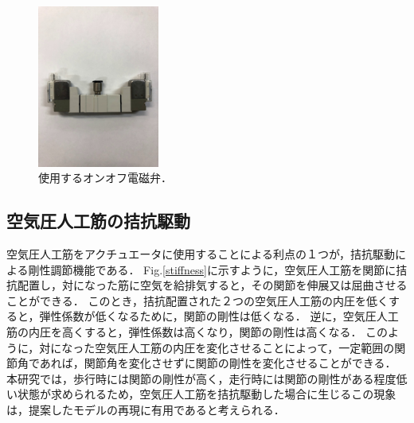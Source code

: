 \begin{figure}[htbp]
 \centering
 \includegraphics[clip,width=4.0cm]{./fig/valve.JPG}
    \caption{使用するオンオフ電磁弁．\label{valve}}
\end{figure}


\subsection{空気圧人工筋の拮抗駆動}
空気圧人工筋をアクチュエータに使用することによる利点の１つが，拮抗駆動による剛性調節機能である．
Fig.\ref{stiffness}に示すように，空気圧人工筋を関節に拮抗配置し，対になった筋に空気を給排気すると，その関節を伸展又は屈曲させることができる．
このとき，拮抗配置された２つの空気圧人工筋の内圧を低くすると，弾性係数が低くなるために，関節の剛性は低くなる．
逆に，空気圧人工筋の内圧を高くすると，弾性係数は高くなり，関節の剛性は高くなる．
このように，対になった空気圧人工筋の内圧を変化させることによって，一定範囲の関節角であれば，関節角を変化させずに関節の剛性を変化させることができる．
本研究では，歩行時には関節の剛性が高く，走行時には関節の剛性がある程度低い状態が求められるため，空気圧人工筋を拮抗駆動した場合に生じるこの現象は，提案したモデルの再現に有用であると考えられる．

